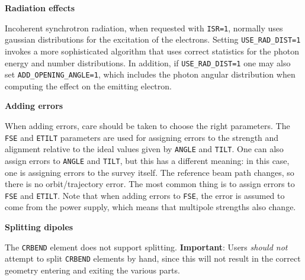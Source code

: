 {\bf Radiation effects}

Incoherent synchrotron radiation, when requested with {\tt ISR=1},
normally uses gaussian distributions for the excitation of the electrons.
Setting {\tt USE\_RAD\_DIST=1} invokes a more sophisticated algorithm that
uses correct statistics for the photon energy and number distributions.
In addition, if {\tt USE\_RAD\_DIST=1} one may also set {\tt ADD\_OPENING\_ANGLE=1},
which includes the photon angular distribution when computing the effect on 
the emitting electron.  

{\bf Adding errors}

When adding errors, care should be taken to choose the right
parameters.  The \verb|FSE| and \verb|ETILT| parameters are used for
assigning errors to the strength and alignment relative to the ideal
values given by \verb|ANGLE| and \verb|TILT|.  One can also assign 
errors to \verb|ANGLE| and \verb|TILT|, but this has a different meaning:
in this case, one is assigning errors to the survey itself.  The reference
beam path changes, so there is no orbit/trajectory error. The most common
thing is to assign errors to \verb|FSE| and \verb|ETILT|.  Note that when
adding errors to \verb|FSE|, the error is assumed to come from the power
supply, which means that multipole strengths also change.

{\bf Splitting dipoles}

The \verb|CRBEND| element does not support splitting.
{\bf Important}: Users {\em should not} attempt to split \verb|CRBEND| elements by hand, since this
will not result in the correct geometry entering and exiting the various parts.
